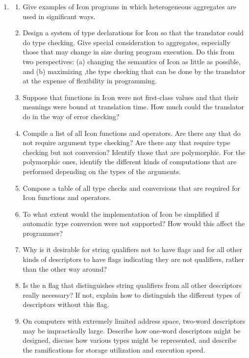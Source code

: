 \liststyleLiv
\begin{enumerate}
\item \begin{enumerate}

\item Give examples of Icon programs in which heterogeneous aggregates
are used in significant ways.

\item Design a system of type declarations for Icon so that the
translator could do type checking. Give special consideration to
aggregates, especially those that may change in size during program
execution. Do this from two perspectives: (a) changing the semantics
of Icon as little as possible, and (b) maximizing ,the type checking
that can be done by the translator at the expense of flexibility in
programming.

\item Suppose that functions in Icon were not first-class values and
that their meanings were bound at translation time. How much could the
translator do in the way of error checking?

\item Compile a list of all Icon functions and operators. Are there
any that do not require argument type checking? Are there any that
require type checking but not conversion? Identify those that are
polymorphic. For the polymorphic ones, identify the different kinds of
computations that are performed depending on the types of the
arguments.

\item Compose a table of all type checks and conversions that are
required for Icon functions and operators.

\item To what extent would the implementation of Icon be simplified if
automatic type conversion were not supported? How would this affect
the programmer?

\item Why is it desirable for string qualifiers not to have flags and
for all other kinds of descriptors to have flags indicating they are
not qualifiers, rather than the other way around?

\item Is the n flag that distinguishes string qualifiers from all
other descriptors really necessary? If not, explain how to distinguish
the different types of descriptors without this flag.

\item On computers with extremely limited address space, two-word
descriptors may be impractically large. Describe how one-word
descriptors might be designed, discuss how various types might be
represented, and describe the ramifications for storage utilization
and execution speed.


\end{enumerate}
\end{enumerate}
